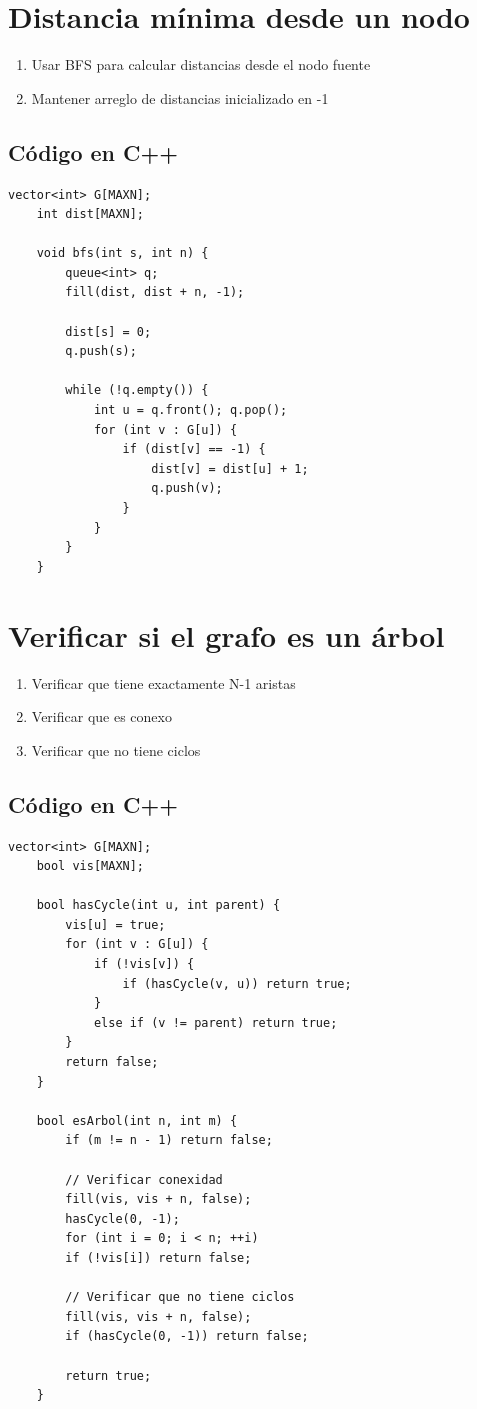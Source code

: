 \section{Distancia mínima desde un nodo}

\begin{enumerate}
	\item Usar BFS para calcular distancias desde el nodo fuente
	\item Mantener arreglo de distancias inicializado en -1
\end{enumerate}

\subsection*{Código en C++}

\begin{lstlisting}[caption=Distancia mínima con BFS]
	vector<int> G[MAXN];
	int dist[MAXN];
	
	void bfs(int s, int n) {
		queue<int> q;
		fill(dist, dist + n, -1);
		
		dist[s] = 0;
		q.push(s);
		
		while (!q.empty()) {
			int u = q.front(); q.pop();
			for (int v : G[u]) {
				if (dist[v] == -1) {
					dist[v] = dist[u] + 1;
					q.push(v);
				}
			}
		}
	}
\end{lstlisting}

\section{Verificar si el grafo es un árbol}

\begin{enumerate}
	\item Verificar que tiene exactamente N-1 aristas
	\item Verificar que es conexo
	\item Verificar que no tiene ciclos
\end{enumerate}

\subsection*{Código en C++}

\begin{lstlisting}[caption=Verificar si grafo es árbol]
	vector<int> G[MAXN];
	bool vis[MAXN];
	
	bool hasCycle(int u, int parent) {
		vis[u] = true;
		for (int v : G[u]) {
			if (!vis[v]) {
				if (hasCycle(v, u)) return true;
			}
			else if (v != parent) return true;
		}
		return false;
	}
	
	bool esArbol(int n, int m) {
		if (m != n - 1) return false;
		
		// Verificar conexidad
		fill(vis, vis + n, false);
		hasCycle(0, -1);
		for (int i = 0; i < n; ++i)
		if (!vis[i]) return false;
		
		// Verificar que no tiene ciclos
		fill(vis, vis + n, false);
		if (hasCycle(0, -1)) return false;
		
		return true;
	}
\end{lstlisting}

